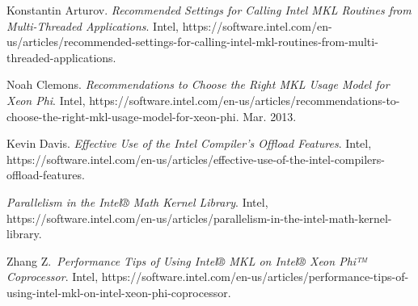 \documentclass{article}
\begin{document}
{%
\begin{thebibliography}{5}%
\label{sec-bibliography}%

Konstantin Arturov. \emph{Recommended Settings for Calling Intel MKL Routines from Multi-Threaded Applications}. Intel, https://software.intel.com/en-us/articles/recommended-settings-for-calling-intel-mkl-routines-from-multi-threaded-applications.\label{mkl_threads}%

Noah Clemons. \emph{Recommendations to Choose the Right MKL Usage Model for Xeon Phi}. Intel, https://software.intel.com/en-us/articles/recommendations-to-choose-the-right-mkl-usage-model-for-xeon-phi. Mar. 2013.\label{mkl-mic}%

Kevin Davis. \emph{Effective Use of the Intel Compiler’s Offload Features}. Intel, https://software.intel.com/en-us/articles/effective-use-of-the-intel-compilers-offload-features.\label{effective_use}%

\emph{Parallelism in the Intel® Math Kernel Library}. Intel, https://software.intel.com/en-us/articles/parallelism-in-the-intel-math-kernel-library.\label{paramkl}%

Zhang Z.~\emph{Performance Tips of Using Intel® MKL on Intel® Xeon Phi™ Coprocessor}. Intel, https://software.intel.com/en-us/articles/performance-tips-of-using-intel-mkl-on-intel-xeon-phi-coprocessor.\label{page_file}%
\par%
\end{thebibliography}}%
\end{document}
